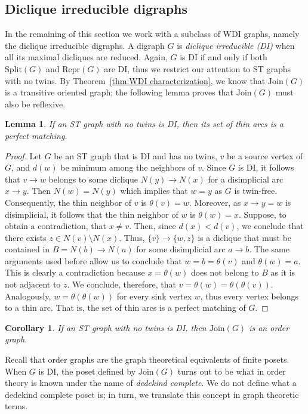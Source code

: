 \documentclass[a4paper,11pt]{article}
\newtheorem{lemma}[theorem]{Lemma}
\newtheorem{corollary}[theorem]{Corollary}
\newcommand{\SPLIT}{\ensuremath{\mathrm{Split}}}
\newcommand{\JOIN}{\ensuremath{\mathrm{Join}}}
\newcommand{\REPG}{\ensuremath{\mathrm{Repr}}}
\newcommand{\TN}{\ensuremath{\theta}}
\begin{document}
\subsection{Diclique irreducible digraphs}

In the remaining of this section we work with a subclass of WDI graphs, namely the diclique irreducible digraphs.  A digraph $G$ is \emph{diclique irreducible (DI)} when all its maximal dicliques are reduced.  Again, $G$ is DI if and only if both $\SPLIT(G)$ and $\REPG(G)$ are DI, thus we restrict our attention to ST graphs with no twins.  By Theorem~\ref{thm:WDI characterization}, we know that $\JOIN(G)$ is a transitive oriented graph; the following lemma proves that $\JOIN(G)$ must also be reflexive.

\begin{lemma}
 If an ST graph with no twins is DI, then its set of thin arcs is a perfect matching.
\end{lemma}

\begin{proof}
  Let $G$ be an ST graph that is DI and has no twins, $v$ be a source vertex of $G$, and $d(w)$ be minimum among the neighbors of $v$.  Since $G$ is DI, it follows that $v \to w$ belongs to some diclique $N(y) \to N(x)$ for a disimplicial arc $x \to y$.  Then $N(w) = N(y)$ which implies that $w = y$ as $G$ is twin-free.  Consequently, the thin neighbor of $v$ is $\TN(v) = w$.  Moreover, as $x \to y = w$ is disimplicial, it follows that the thin neighbor of $w$ is $\TN(w) = x$.  Suppose, to obtain a contradiction, that $x \neq v$.  Then, since $d(x) < d(v)$, we conclude that there exists $z \in N(v) \setminus N(x)$.  Thus, $\{v\} \to \{w,z\}$ is a diclique that must be contained in $B = N(b) \to N(a)$ for some disimplicial arc $a \to b$.  The same arguments used before allow us to conclude that $w = b = \TN(v)$ and $\TN(w) = a$.  This is clearly a contradiction because $x = \TN(w)$ does not belong to $B$ as it is not adjacent to $z$. We conclude, therefore, that $v = \TN(w) = \TN(\TN(v))$.  Analogously, $w = \TN(\TN(w))$ for every sink vertex $w$, thus every vertex belongs to a thin arc.  That is, the set of thin arcs is a perfect matching of $G$.
\end{proof}

\begin{corollary}
 If an ST graph with no twins is DI, then\/ $\JOIN(G)$ is an order graph.
\end{corollary}

Recall that order graphs are the graph theoretical equivalents of finite posets.  When $G$ is DI, the poset defined by $\JOIN(G)$ turns out to be what in order theory is known under the name of \emph{dedekind complete}.  We do not define what a dedekind complete poset is; in turn, we translate this concept in graph theoretic terms.
\end{document}
